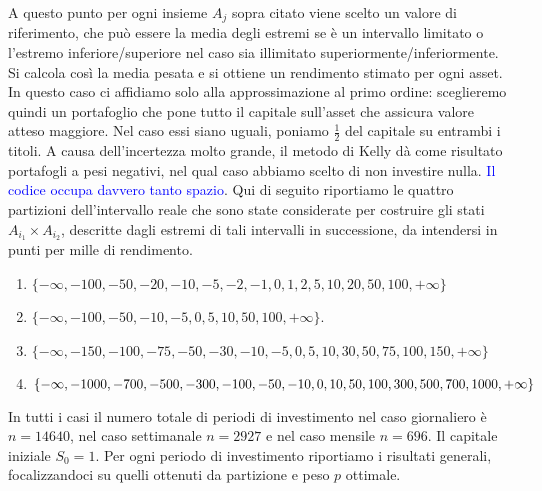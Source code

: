 \documentclass[a4paper,11pt]{book}
\theoremstyle{plain}
\theoremstyle{definition}
\theoremstyle{remark}
\begin{document}
A questo punto per ogni insieme $A_j$ sopra citato viene scelto un valore di riferimento, che può essere la media degli estremi se è un intervallo limitato o l'estremo inferiore/superiore nel caso sia illimitato superiormente/inferiormente. Si calcola così la media pesata e si ottiene un rendimento stimato per ogni asset.\newline
In questo caso ci affidiamo solo alla approssimazione al primo ordine: sceglieremo quindi un portafoglio che pone tutto il capitale sull'asset che assicura valore atteso maggiore. Nel caso essi siano uguali, poniamo $\frac{1}{2}$ del capitale su entrambi i titoli. A causa dell'incertezza molto grande, il metodo di Kelly dà come risultato portafogli a pesi negativi, nel qual caso abbiamo scelto di non investire nulla.\newline
\textcolor{blue}{Il codice occupa davvero tanto spazio}.\newline
Qui di seguito riportiamo le quattro partizioni dell'intervallo reale che sono state considerate per costruire gli stati $A_{i_1}\times A_{i_2}$, descritte dagli estremi di tali intervalli in successione, da intendersi in punti per mille di rendimento.
\begin{enumerate}
	\item $\{-\infty, -100, -50, -20, -10, -5, -2, -1, 0, 1, 2, 5, 10, 20, 50, 100, +\infty\}$
	\item $\{-\infty, -100, -50, -10, -5, 0, 5, 10, 50, 100, +\infty\}$.
	\item $\{-\infty, -150, -100, -75, -50, -30, -10, -5, 0, 5, 10, 30, 50, 75, 100, 150, +\infty\}$
	\item $\{-\infty, -1000, -700, -500, -300, -100, -50, -10,  0,\\ 10, 50, 100, 300, 500, 700, 1000, +\infty\}$
\end{enumerate}
In tutti i casi il numero totale di periodi di investimento nel caso giornaliero è $n=14640$, nel caso settimanale $ n=2927$ e nel caso mensile $n = 696$. Il capitale iniziale $S_0=1$. Per ogni periodo di investimento riportiamo i risultati generali, focalizzandoci su quelli ottenuti da partizione e peso $p$ ottimale.
\end{document}
